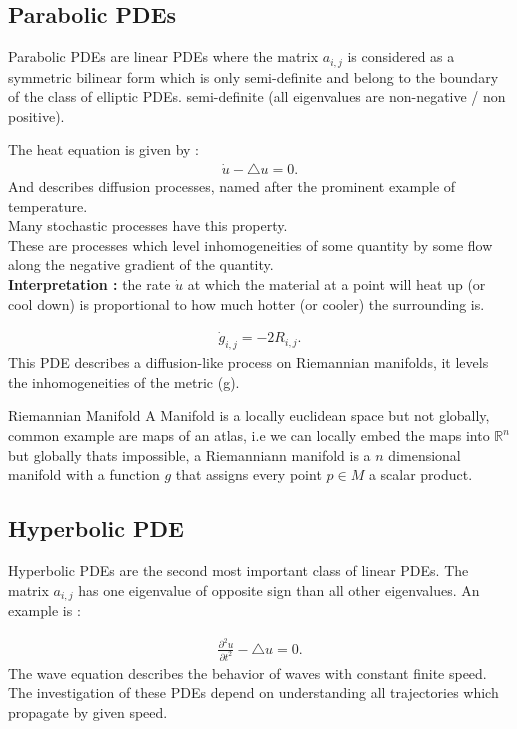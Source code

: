 \subsection{Parabolic PDEs} %
\label{sub:Parabolic PDEs}
Parabolic PDEs are linear PDEs where the matrix $a_{i,j}$ is considered as a symmetric
bilinear form which is only semi-definite and belong to the boundary of the class of elliptic PDEs.
semi-definite (all eigenvalues are non-negative / non positive).
\begin{example}
	The heat equation is given by :
	\begin{align*}
		\dot{u} - \triangle u = 0
		.\end{align*}
	And describes diffusion processes, named after the prominent example of temperature.\\
	Many stochastic processes have this property. \\[1ex]
	These are processes which level inhomogeneities of some quantity by some flow along the negative gradient of the quantity.\\
	\textbf{Interpretation : }  the rate $\dot{u}$ at which the material at a point will heat up (or cool down) is proportional
	to how much hotter (or cooler) the surrounding is.\\
\end{example}
\begin{comment}
Tools of Laplace equation can be applied in modified form to this heat equation
\end{comment}
\begin{example}
	\begin{align*}
		\dot{g}_{i,j} = -2R_{i,j}
		.\end{align*}
	This PDE describes a diffusion-like process on Riemannian manifolds, it levels the inhomogeneities of the metric (g).
\end{example}
\begin{definition}{Riemannian Manifold}
	A Manifold is a  locally euclidean space but not globally, common example are maps of an atlas,
	i.e we can locally embed the maps into $\mathbb{R}^{n} $ but globally thats impossible, a Riemanniann manifold is
	a $n$ dimensional manifold with a function $g$ that assigns every point $p \in  M$  a scalar product.
\end{definition}
\subsection{Hyperbolic PDE} %
\label{sub:Hyperbolic PDE}
Hyperbolic PDEs are the second most important class of linear PDEs.
The matrix $a_{i,j}$ has one eigenvalue of opposite sign than all other eigenvalues.
An example is :
\begin{example}
	\begin{align*}
		\frac{\partial^2 u}{\partial t^2} - \triangle u = 0
		.\end{align*}
	The wave equation describes the behavior of waves with constant finite speed.
	The investigation of these PDEs depend on understanding all trajectories which propagate by given speed.
\end{example}

